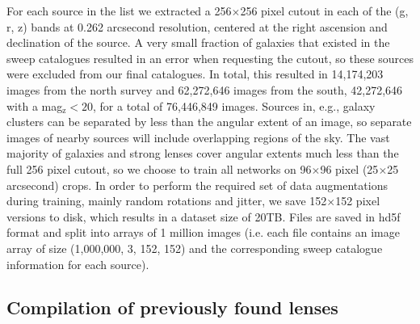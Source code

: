 \documentclass{aastex631}
\newcommand{\zmag}{mag$_{\mathrm{z}}$}
\begin{document}
For each source in the list we extracted a 256$\times$256 pixel cutout in each of the (g, r, z) bands at 0.262 arcsecond resolution, centered at the right ascension and declination of the source. A very small fraction of galaxies that existed in the sweep catalogues resulted in an error when requesting the cutout, so these sources were excluded from our final catalogues. In total, this resulted in 14,174,203 images from the north survey and 62,272,646 images from the south, 42,272,646 with a \zmag $< 20$, for a total of 76,446,849 images. Sources in, e.g., galaxy clusters can be separated by less than the angular extent of an image, so separate images of nearby sources will include overlapping regions of the sky. The vast majority of galaxies and strong lenses cover angular extents much less than the full 256 pixel cutout, so we choose to train all networks on 96$\times$96 pixel (25$\times$25 arcsecond) crops. In order to perform the required set of data augmentations during training, mainly random rotations and jitter, we save 152$\times$152 pixel versions to disk, which results in a dataset size of 20TB. Files are saved in hd5f format and split into arrays of 1 million images (i.e. each file contains an image array of size (1,000,000, 3, 152, 152) and the corresponding sweep catalogue information for each source).  


\subsection{Compilation of previously found lenses}
\label{sec:data_lenses}
\end{document}
